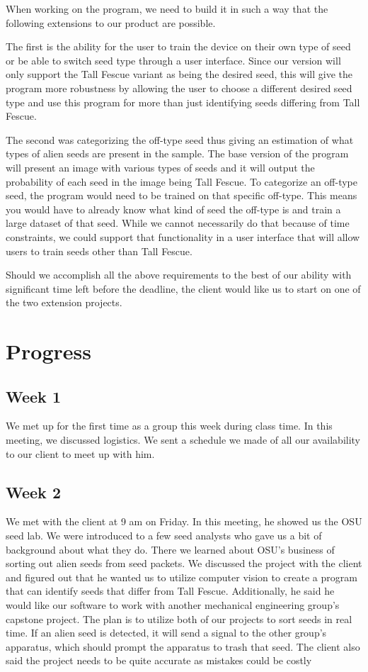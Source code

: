 \documentclass[onecolumn, draftclsnofoot,10pt, compsoc]{IEEEtran}
\begin{document}
	When working on the program, we need to build it in such a way that the following extensions to our product are possible.
	
	The first is the ability for the user to train the device on their own type of seed or be able to switch seed type through a user interface. Since our version will only support the Tall Fescue variant as being the desired seed, this will give the program more robustness by allowing the user to choose a different desired seed type and use this program for more than just identifying seeds differing from Tall Fescue.
	
	The second was categorizing the off-type seed thus giving an estimation of what types of alien seeds are present in the sample. The base version of the program will present an image with various types of seeds and it will output the probability of each seed in the image being Tall Fescue. To categorize an off-type seed, the program would need to be trained on that specific off-type. This means you would have to already know what kind of seed the off-type is and train a large dataset of that seed. While we cannot necessarily do that because of time constraints, we could support that functionality in a user interface that will allow users to train seeds other than Tall Fescue.   
	
	Should we accomplish all the above requirements to the best of our ability with significant time left before the deadline, the client would like us to start on one of the two extension projects.
	
	
	\section{Progress}
	
	\subsection{Week 1}
	We met up for the first time as a group this week during class time. In this meeting, we discussed logistics. We sent a schedule we made of all our availability to our client to meet up with him.
	\subsection{Week 2}
	We met with the client at 9 am on Friday. In this meeting, he showed us the OSU seed lab. We were introduced to a few seed analysts who gave us a bit of background about what they do. There we learned about OSU's business of sorting out alien seeds from seed packets. We discussed the project with the client and figured out that he wanted us to utilize computer vision to create a program that can identify seeds that differ from Tall Fescue. Additionally, he said he would like our software to work with another mechanical engineering group's capstone project. The plan is to utilize both of our projects to sort seeds in real time. If an alien seed is detected, it will send a signal to the other group's apparatus, which should prompt the apparatus to trash that seed. The client also said the project needs to be quite accurate as mistakes could be costly 
\end{document}
